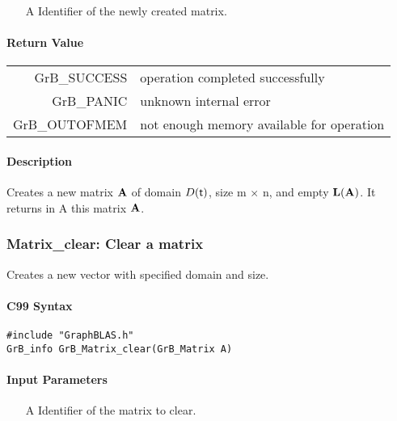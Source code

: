 \begin{itemize}
	\item[{\sf A}] Identifier of the newly created matrix.
\end{itemize}

\paragraph{Return Value}

\begin{tabular}{rl} 
{\sf GrB\_SUCCESS} 	& operation completed successfully \\
{\sf GrB\_PANIC}	& unknown internal error \\
{\sf GrB\_OUTOFMEM}	& not enough memory available for operation \\
\end{tabular}

\paragraph{Description}

Creates a new matrix ${\bf A}$ of domain $D({\sf t})$, size {\sf m $\times$ n}, and
empty $\bold{L}({\bf A})$. It returns in {\sf A} this matrix ${\bf A}$.


\subsubsection{{\sf Matrix\_clear}: Clear a matrix}

Creates a new vector with specified domain and size.

\paragraph{C99 Syntax}

\begin{verbatim}
#include "GraphBLAS.h"
GrB_info GrB_Matrix_clear(GrB_Matrix A)
\end{verbatim}

\paragraph{Input Parameters}

\begin{itemize}
	\item[{\sf A}] Identifier of the matrix to clear.
\end{itemize}

